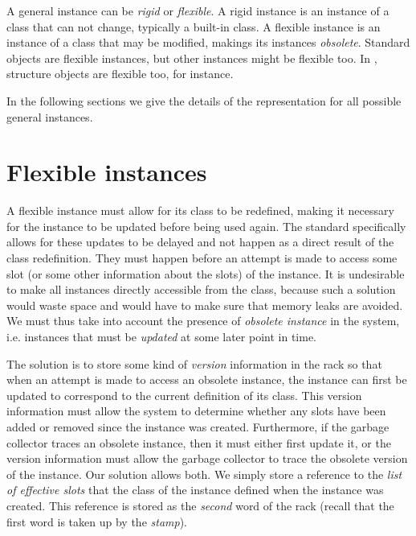 A general instance can be \emph{rigid} or \emph{flexible}.  A rigid
instance is an instance of a class that can not change, typically a
built-in class.  A flexible instance is an instance of a class that
may be modified, makings its instances \emph{obsolete}.  Standard
objects are flexible instances, but other instances might be flexible
too.  In \sysname{}, structure objects are flexible too, for
instance.

In the following sections we give the details of the representation
for all possible general instances.

\section{Flexible instances}
\label{sec-data-representation-flexible-instances}

A flexible instance must allow for its class to be redefined, making
it necessary for the instance to be updated before being used again.  The
standard specifically allows for these updates to be delayed and not
happen as a direct result of the class redefinition.  They must happen
before an attempt is made to access some slot (or some other
information about the slots) of the instance.  It is undesirable to
make all instances directly accessible from the class, because
such a solution would waste space and would have to make sure that
memory leaks are avoided.  We must thus take into account the presence
of \emph{obsolete instance} in the system, i.e. instances that must
be \emph{updated} at some later point in time.

The solution is to store some kind of \emph{version} information in
the rack so that when an attempt is made to access an
obsolete instance, the instance can first be updated to correspond to
the current definition of its class.  This version information must
allow the system to determine whether any slots have been added or
removed since the instance was created.  Furthermore, if the garbage
collector traces an obsolete instance, then it must either first
update it, or the version information must allow the garbage collector
to trace the obsolete version of the instance.  Our solution allows
both.  We simply store a reference to the \emph{list of effective
  slots} that the class of the instance defined when the instance was
created.  This reference is stored as the \emph{second} word of the
rack (recall that the first word is taken up by the
\emph{stamp}). 

